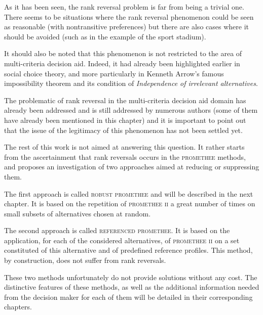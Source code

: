 As it has been seen, the rank reversal problem is far from being a trivial one.
There seems to be situations where the rank reversal phenomenon could be seen as reasonable (with nontransitive preferences) but there are also cases where it should be avoided (such as in the example of the sport stadium). 

It should also be noted that this phenomenon is not restricted to the area of multi-criteria decision aid.
Indeed, it had already been highlighted earlier in social choice theory, and more particularly in Kenneth Arrow's famous impossibility theorem \cite{arrow1950difficulty} and its condition of \textit{Independence of irrelevant alternatives}.

The problematic of rank reversal in the multi-criteria decision aid domain has already been addressed and is still addressed by numerous authors (some of them have already been mentioned in this chapter) and it is important to point out that the issue of the legitimacy of this phenomenon has not been settled yet.

The rest of this work is not aimed at answering this question. 
It rather starts from the ascertainment that rank reversals occurs in the \textsc{promethee} methods, and proposes an investigation of two approaches aimed at reducing or suppressing them.

The first approach is called \textsc{robust promethee} and will be described in the next chapter.
It is based on the repetition of \textsc{promethee ii} a great number of times on small subsets of alternatives chosen at random. 

The second approach is called \textsc{referenced promethee}. It is based on the application, for each of the considered alternatives, of \textsc{promethee ii} on a set constituted of this alternative and of predefined reference profiles. This method, by construction, does not suffer from rank reversals.

These two methods unfortunately do not provide solutions without any cost. The distinctive features of these methods, as well as the additional information needed from the decision maker for each of them will be detailed in their corresponding chapters.




